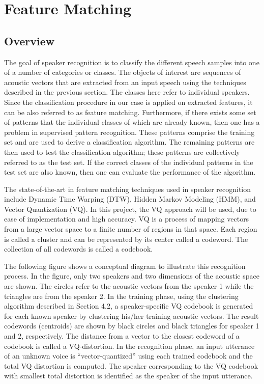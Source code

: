 \documentclass{article}
\begin{document}
\section{Feature Matching}
\subsection{Overview}
The goal of speaker recognition is to classify the different speech samples into one of a number of categories or classes.  The objects of interest are sequences of acoustic vectors that are extracted from an input speech using the techniques described in the previous section.  The classes here refer to individual speakers.  Since the classification procedure in our case is applied on extracted features, it can be also referred to as feature matching. Furthermore, if there exists some set of patterns that the individual classes of which are already known, then one has a problem in supervised pattern recognition.  These patterns comprise the training set and are used to derive a classification algorithm.  The remaining patterns are then used to test the classification algorithm; these patterns are collectively referred to as the test set.  If the correct classes of the individual patterns in the test set are also known, then one can evaluate the performance of the algorithm.

The state-of-the-art in feature matching techniques used in speaker recognition include Dynamic Time Warping (DTW), Hidden Markov Modeling (HMM), and Vector Quantization (VQ).  In this project, the VQ approach will be used, due to ease of implementation and high accuracy.  VQ is a process of mapping vectors from a large vector space to a finite number of regions in that space.  Each region is called a cluster and can be represented by its center called a codeword.  The collection of all codewords is called a codebook.

The following figure shows a conceptual diagram to illustrate this recognition process.  In the figure, only two speakers and two dimensions of the acoustic space are shown.  The circles refer to the acoustic vectors from the speaker 1 while the triangles are from the speaker 2.  In the training phase, using the clustering algorithm described in Section 4.2,  a speaker-specific VQ codebook is generated for each known speaker by clustering his/her training acoustic vectors.  The result codewords (centroids) are shown by black circles and black triangles for speaker 1 and 2, respectively.  The distance from a vector to the closest codeword of a codebook is called a VQ-distortion.  In the recognition phase, an input utterance of an unknown voice is “vector-quantized” using each trained codebook and the total VQ distortion is computed.  The speaker corresponding to the VQ codebook with smallest total distortion is identified as the speaker of the input utterance. 
\end{document}
